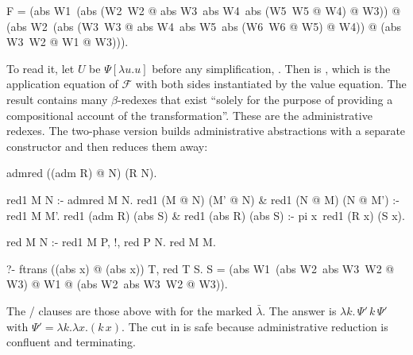 {{\begin{lprolog}
F = (abs W1\ (abs (W2\ W2 @ abs W3\ abs W4\ abs (W5\ W5 @ W4) @ W3)) @
     (abs W2\ (abs (W3\ W3 @ abs W4\ abs W5\ abs (W6\ W6 @ W5) @ W4)) @
     (abs W3\ W2 @ W1 @ W3))).
\end{lprolog}
\noindent To read it, let $U$ be $\Psi[\lambda u.u]$ before any simplification,
. Then  is
, which is the
application equation of $\mathcal{F}$ with both sides instantiated by the value equation. The result
contains many $\beta$-redexes that exist ``solely for the purpose of providing a compositional account of
the transformation''. These are the administrative redexes. The two-phase version  builds administrative abstractions with a separate constructor
 and then reduces them away:
\begin{lprolog}
admred ((adm R) @ N) (R N).

red1 M N :- admred M N.
red1 (M @ N) (M' @ N) & red1 (N @ M) (N @ M') :- red1 M M'.
red1 (adm R) (abs S) & red1 (abs R) (abs S) :-
    pi x\ red1 (R x) (S x).

red M N :- red1 M P, !, red P N.
red M M.

?- ftrans ((abs x\x) @ (abs x\x)) T, red T S.
S = (abs W1\ (abs W2\ abs W3\ W2 @ W3) @ W1 @ (abs W2\ abs W3\ W2 @ W3)).
\end{lprolog}
\noindent The / clauses are those above with  for the marked $\bar\lambda$. The
answer is $\lambda k.\,\Psi'\,k\,\Psi'$ with $\Psi'=\lambda k.\lambda x.(k\,x)$. The cut in  is
safe because administrative reduction is confluent and terminating.

}}
